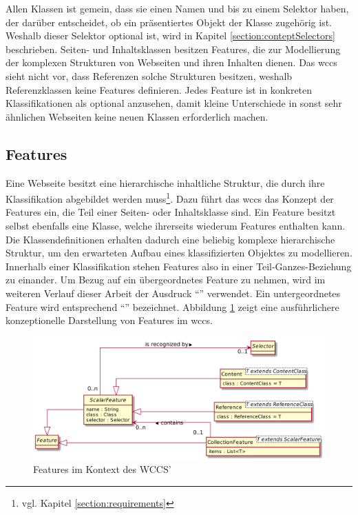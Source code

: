         Allen Klassen ist gemein, dass sie einen Namen und bis zu einem Selektor haben,
        der darüber entscheidet, ob ein präsentiertes Objekt der Klasse zugehörig ist.
        Weshalb dieser Selektor optional ist, wird in Kapitel \ref{section:conteptSelectors} beschrieben.
        Seiten- und Inhaltsklassen besitzen Features,
        die zur Modellierung der komplexen Strukturen von Webseiten und ihren Inhalten dienen.
        Das \gls{wccs} sieht nicht vor, dass Referenzen solche Strukturen besitzen,
        weshalb Referenzklassen keine Features definieren.
        Jedes Feature ist in konkreten Klassifikationen als optional anzusehen,
        damit kleine Unterschiede in sonst sehr ähnlichen Webseiten keine neuen Klassen erforderlich machen.

    \subsection{Features}
        \label{section:conceptFeatures}
        Eine Webseite besitzt eine hierarchische inhaltliche Struktur,
        die durch ihre Klassifikation abgebildet werden muss\footnote{vgl. Kapitel \ref{section:requirements}}.      
        Dazu führt das \gls{wccs} das Konzept der Features ein,
        die Teil einer Seiten- oder Inhaltsklasse sind.
        Ein Feature besitzt selbst ebenfalls eine Klasse,
        welche ihrerseits wiederum Features enthalten kann.
        Die Klassendefinitionen erhalten dadurch eine beliebig komplexe hierarchische Struktur,
        um den erwarteten Aufbau eines klassifizierten Objektes zu modellieren.
        Innerhalb einer Klassifikation stehen Features also in einer Teil-Ganzes-Beziehung zu einander.
        Um Bezug auf ein übergeordnetes Feature zu nehmen,
        wird im weiteren Verlauf dieser Arbeit der Ausdruck "`\parentFeature"' verwendet.
        Ein untergeordnetes Feature wird entsprechend "`\childFeature"' bezeichnet.
        Abbildung \ref{image:conceptFeatures} zeigt eine ausführlichere
        konzeptionelle Darstellung von Features im \gls{wccs}.

        \begin{figure}[htb]
            \centering
            \includegraphics[scale=\imageScalingFactor]{../resources/concept/features.png}
            \caption{Features im Kontext des WCCS'}
            \label{image:conceptFeatures}
        \end{figure}

